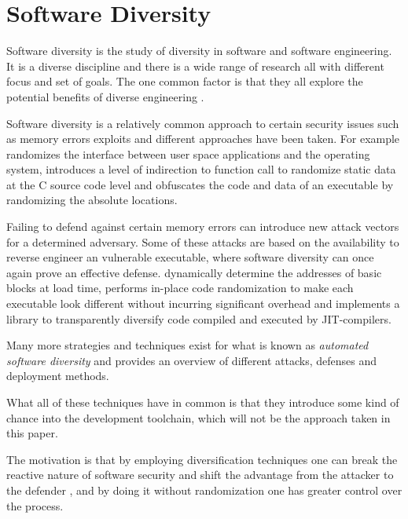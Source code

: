 \section{Software Diversity}

Software diversity is the study of diversity in software and software engineering. It is
a diverse discipline and there is a wide range of research all with different focus and
set of goals. The one common factor is that they all explore the potential benefits of
diverse engineering \cite{survey}.

Software diversity is a relatively common approach to certain security issues such as
memory errors exploits and different approaches have been taken. For example
\textcite{os-randomization} randomizes the interface between user space applications and
the operating system, \textcite{mem-exploits} introduces a level of indirection to function
call to randomize static data at the C source code level and \textcite{add-obfuscation}
obfuscates the code and data of an executable by randomizing the absolute locations.

Failing to defend against certain memory errors can introduce new attack vectors for a
determined adversary. Some of these attacks are based on the availability to reverse engineer
an vulnerable executable, where software diversity can once again prove an effective defense.
\textcite{binary-stirring} dynamically determine the addresses of basic blocks at load time,
\textcite{smashing-gadgets} performs in-place code randomization to make each executable
look different without incurring significant overhead and \textcite{librando} implements
a library to transparently diversify code compiled and executed by JIT-compilers.

Many more strategies and techniques exist for what is known as
\textit{automated software diversity} and \textcite{SoK} provides an overview of different
attacks, defenses and deployment methods.


What all of these techniques have in common is that they introduce some kind of chance into
the development toolchain, which will not be the approach taken in this paper.

The motivation is that by employing diversification techniques one can break the
reactive nature of software security and shift the advantage from the attacker to the
defender \cite{compiler-generated-sw-div}, and by doing it without randomization one has
greater control over the process.

